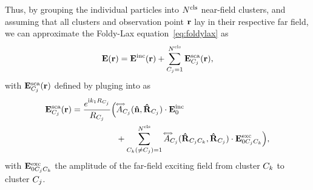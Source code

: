 Thus, by grouping the individual particles into $\Ncls$ near-field clusters, and assuming that all clusters and observation point $\px$ lay in their respective far field, we can approximate the Foldy-Lax equation~\eqref{eq:foldylax} as
\begin{equation}
\mathbf{E}(\mathbf{r}) = \mathbf{E}^\text{inc}(\mathbf{r}) + \sum_{C_j=1}^{{N^\text{cls}}} \mathbf{E}^\text{sca}_{C_j}(\mathbf{r}),
\label{eq:foldylaxcluster}
\end{equation}
%
with $\mathbf{E}^\text{sca}_{C_j}(\mathbf{r})$ defined by pluging  into  as
\begin{align}
\mathbf{E}^\text{sca}_{C_j}(\mathbf{r}) = \frac{e^{\text{i} k_1 R_{C_j}}}{R_{C_j}}\Big( &  \accentset{\Longleftrightarrow}{A}_{C_j}(\mathbf{\hat{n}},\mathbf{\hat{R}}_{C_j})\cdot\mathbf{E}^\text{inc}_0  \\ & + \sum_{{C_k}(\neq{C_j})=1}^{N^\text{cls}} \accentset{\Longleftrightarrow}{A}_{C_j}(\mathbf{\hat{R}}_{{C_j}{C_k}},\mathbf{\hat{R}}_{C_j})\cdot\mathbf{E}^\text{exc}_{0{C_j} {C_k}}  \Big),
\label{eq:scatfieldcluster2}
\end{align}
%
with $\mathbf{E}^\text{exc}_{0{C_j} {C_k}}$ the amplitude of the far-field exciting field from cluster $C_k$ to cluster $C_j$. 
\endinput
\section{Statistical average and the coherent field}
%
While the Foldy-Lax equation for clusters in the far-field region~\eqref{eq:foldylaxcluster} can be computed numerically by solving a linear system, this rapidly becomes impractical for a large $\Ncls$. This is actually the case for media in the real world, generally composed by a large number of randomly-distributed particles (and therefore clusters of particles). 
%
Therefore, the electric field $\EField(\px)$ at a point $\px$ is a random function of the time-dependent position $\Px_\Cls$ and properties of clusters $\Pprops_\Cls$ (including e.g. the position of the scatterers within the cluster, their shape, or their permittivity $\sPermittivity$) within the media following a distribution $p(\Px_\Cls,\Pprops_\Cls)$. 

This random field $\EField(\px)$ can be decomposed into the average or coherent field $\CoEField(\px)$ and the fluctuating field $\FlucEField(\px)$ as $\EField(\px)=\CoEField(\px)+\FlucEField(\px)$, where $\CoEField(\px)=\EV{\EField(\px)}$ is the expected value of $\EField(\px)$ and therefore $\EV{\FlucEField(\px)}=0$. 
%
Note that the fluctuating field results into the so-called so-called subjective speckle~\cite{bar2020rendering}; we however focus only on the average coherent field, although our results from Section~\ref{sec:farfield_foldy_clusters} could be used for rendering the fluctuating field too. 

